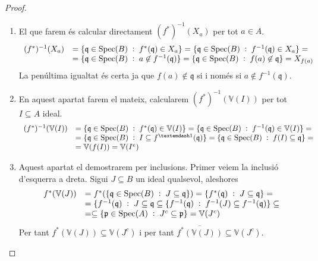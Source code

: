 \documentclass[../../../main.tex]{subfiles}
\begin{document}
\begin{proof}
\begin{enumerate}
    \item El que farem és calcular directament $(f^*)^{-1}(X_a)$ per tot $a\in A$.
    \begin{equation}
        \notag
        \begin{array}{rl}
            (f^*)^{-1}(X_a) & = \{\mathfrak{q}\in\mathrm{Spec}(B)\;:\;f^*(\mathfrak{q})\in X_a\} = \{\mathfrak{q}\in\mathrm{Spec}(B)\;:\;f^{-1}(\mathfrak{q})\in X_a\} =  \\
             & = \{\mathfrak{q}\in\mathrm{Spec}(B)\;:\;a\not\in f^{-1}(\mathfrak{q})\} = \{\mathfrak{q}\in\mathrm{Spec}(B)\;:\;f(a)\not\in\mathfrak{q}\} = X_{f(a)}
        \end{array}
    \end{equation}
    La penúltima igualtat és certa ja que $f(a)\not\in \mathfrak{q}$ si i només si $a\not\in f^{-1}(\mathfrak{q})$.
    
    \item En aquest apartat farem el mateix, calcularem $(f^*)^{-1}(\mathbb{V}(I))$ per tot $I\subseteq A$ ideal.
    \begin{equation}
        \notag\begin{array}{rl}
            (f^*)^{-1}(\mathbb{V}(I)) &  = \{\mathfrak{q}\in\spec{B}\;:\;f^*(\mathfrak{q})\in\mathbb{V}(I)\} = \{\mathfrak{q}\in\spec{B}\;:\;f^{-1}(\mathfrak{q})\in\mathbb{V}(I)\} = \\
             &  = \{\mathfrak{q}\in\spec{B}\;:\;I\subseteq f^{—1}(\mathfrak{q})\} = \{\mathfrak{q}\in\spec{B}\;:\;f(I)\subseteq \mathfrak{q}\} = \\
             & = \mathbb{V}(f(I)) = \mathbb{V}(I^{e})
        \end{array}
    \end{equation}
    
    \item Aquest apartat el demostrarem per inclusions. Primer veiem la inclusió d'esquerra a dreta. Sigui $J\subseteq B$ un ideal qualsevol, aleshores
    \begin{equation}
        \notag
        \begin{array}{rl}
            f^*(\mathbb{V}(J)) & = f^*(\{\mathfrak{q}\in\mathrm{Spec}(B)\;:\;J\subseteq\mathfrak{q}\}) = \{f^*(\mathfrak{q})\;:\;J\subseteq \mathfrak{q}\} =  \\
             & = \{f^{-1}(\mathfrak{q})\;:\;J\subseteq\mathfrak{q}\subseteq\{f^{-1}(\mathfrak{q})\;:\;f^{-1}(J)\subseteq f^{-1}(\mathfrak{q})\}\subseteq \\
             & = \subseteq \{\mathfrak{p}\in\mathrm{Spec}(A)\;:\;J^c\subseteq\mathfrak{p}\} = \mathbb{V}(J^c)
        \end{array} 
    \end{equation}
    Per tant $f^*(\mathbb{V}(J))\subseteq \mathbb{V}(J^c)$ i per tant $\overline{f^*(\mathbb{V}(J))}\subseteq\mathbb{V}(J^c)$.
    

\end{enumerate}
\end{proof}
\end{document}
